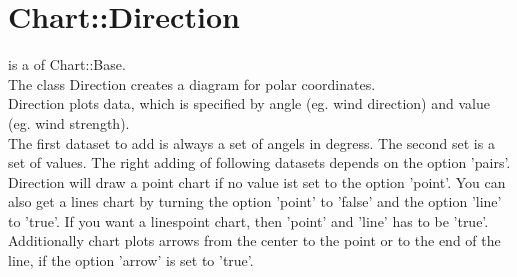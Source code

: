 %
%
\section{Chart::Direction}

\begin{Description} 
 is a  of Chart::Base.\\
The class Direction creates a diagram for polar coordinates.\\
Direction plots data, which is specified by angle (eg. wind direction) and value (eg. wind strength).\\
The first dataset to add is always a set of angels in degress. The second set is a set of values. The right adding of following datasets depends on the option 'pairs'.\\
Direction will draw a point chart if no value ist set to the option 'point'. You can also get a lines chart by turning the option 'point' to 'false' and the option 'line' to 'true'. If you want a linespoint chart, then 'point' and 'line' has to be 'true'. Additionally chart plots arrows from the center to the point or to the end of the line, if the option 'arrow' is set to 'true'.
\end{Description}

